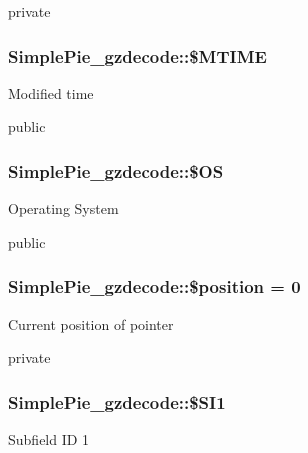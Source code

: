 private \hypertarget{class_simple_pie__gzdecode_ae9d52ef0eb9318025ac65573ca04170c}{
\subsubsection[{\$\-M\-T\-I\-M\-E}]{\setlength{\rightskip}{0pt plus 5cm}Simple\-Pie\-\_\-gzdecode\-::\$\-M\-T\-I\-M\-E}}\label{class_simple_pie__gzdecode_ae9d52ef0eb9318025ac65573ca04170c}
Modified time

public \hypertarget{class_simple_pie__gzdecode_a33624266302345cf73d9b111207aafd9}{
\subsubsection[{\$\-O\-S}]{\setlength{\rightskip}{0pt plus 5cm}Simple\-Pie\-\_\-gzdecode\-::\$\-O\-S}}\label{class_simple_pie__gzdecode_a33624266302345cf73d9b111207aafd9}
Operating System

public \hypertarget{class_simple_pie__gzdecode_ad5e872a132be02e3551b03e4357d9d50}{
\subsubsection[{\$position}]{\setlength{\rightskip}{0pt plus 5cm}Simple\-Pie\-\_\-gzdecode\-::\$position = 0}}\label{class_simple_pie__gzdecode_ad5e872a132be02e3551b03e4357d9d50}
Current position of pointer

private \hypertarget{class_simple_pie__gzdecode_a0aa7d71c5e0b1a53dc39a8e2648a8f7d}{
\subsubsection[{\$\-S\-I1}]{\setlength{\rightskip}{0pt plus 5cm}Simple\-Pie\-\_\-gzdecode\-::\$\-S\-I1}}\label{class_simple_pie__gzdecode_a0aa7d71c5e0b1a53dc39a8e2648a8f7d}
Subfield I\-D 1

